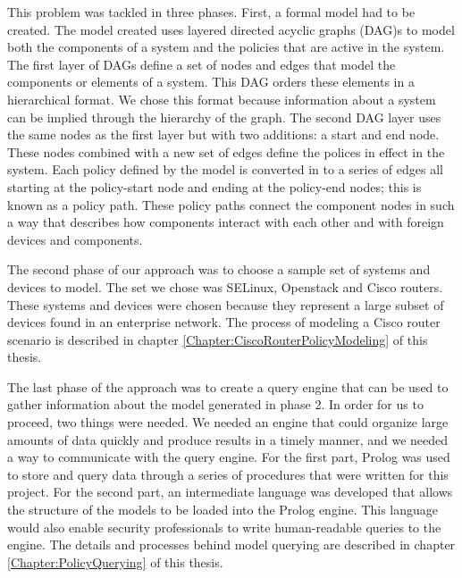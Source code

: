 \documentclass[12pt,letterpaper]{report}
\begin{document}
This problem was tackled in three phases. First, a formal model had to be created. The model created uses layered directed acyclic graphs (DAG)s to model both the components of a system and the policies that are active in the system. The first layer of DAGs define a set of nodes and edges that model the components or elements of a system. This DAG orders these elements in a hierarchical format. We chose this format because information about a system can be implied through the hierarchy of the graph. The second DAG layer uses the same nodes as the first layer but with two additions: a start and end node. These nodes combined with a new set of edges define the polices in effect in the system. Each policy defined by the model is converted in to a series of edges all starting at the policy-start node and ending at the policy-end nodes; this is known as a policy path. These policy paths connect the component nodes in such a way that describes how components interact with each other and with foreign devices and components.

The second phase of our approach was to choose a sample set of systems and devices to model. The set we chose was SELinux, Openstack and Cisco routers. These systems and devices were chosen because they represent a large subset of devices found in an enterprise network. The process of modeling a Cisco router scenario is described in chapter \ref{Chapter:CiscoRouterPolicyModeling} of this thesis.

The last phase of the approach was to create a query engine that can be used to gather information about the model generated in phase 2. In order for us to proceed, two things were needed. We needed an engine that could organize large amounts of data quickly and produce results in a timely manner, and we needed a way to communicate with the query engine. For the first part, Prolog was used to store and query data through a series of procedures that were written for this project. For the second part, an intermediate language was developed that allows the structure of the models to be loaded into the Prolog engine. This language would also enable security professionals to write human-readable queries to the engine. The details and processes behind model querying are described in chapter \ref{Chapter:PolicyQuerying} of this thesis.

\end{document}
